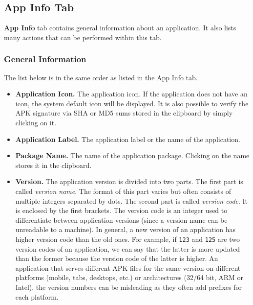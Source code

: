 \subsection{App Info Tab}\label{subsec:app-info-tab} %
\textbf{App Info} tab contains general information about an application. It also lists many actions that can be
performed within this tab.

\subsubsection{General Information}\label{subsubsec:app-info-general-information} %
The list below is in the same order as listed in the App Info tab.
\begin{itemize}
    \item \textbf{Application Icon.} The application icon. If the application does not have an icon, the system default
    icon will be displayed. It is also possible to verify the APK signature via SHA or MD5 sums stored in the clipboard
    by simply clicking on it.

    \item \textbf{Application Label.} The application label or the name of the application.

    \item \textbf{Package Name.} The name of the application package. Clicking on the name stores it in the clipboard.

    \item \textbf{Version.} The application version is divided into two parts. The first part is called \textit{version
    name}. The format of this part varies but often consists of multiple integers separated by dots. The second part
    is called \textit{version code}. It is enclosed by the first brackets. The version code is an integer used to
    differentiate between application versions (since a version name can be unreadable to a machine). In general,
    a new version of an application has higher version code than the old ones. For example, if \texttt{123} and
    \texttt{125} are two version codes of an application, we can say that the latter is more updated than the former
    because the version code of the latter is higher. An application that serves different APK files for the same version
    on different platforms (mobile, tabs, desktops, etc.) or architectures (32/64 bit, ARM or Intel), the version
    numbers can be misleading as they often add prefixes for each platform.


\end{itemize}
